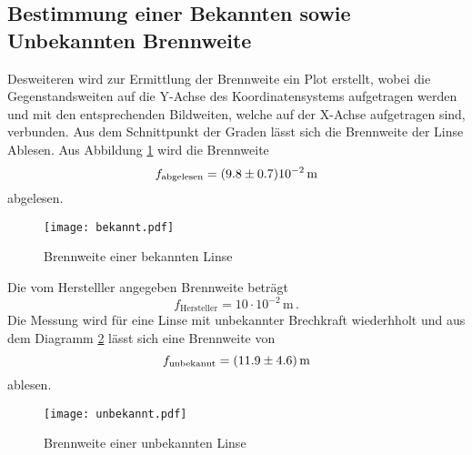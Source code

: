 \subsection{Bestimmung einer Bekannten sowie Unbekannten Brennweite}
Desweiteren wird zur Ermittlung der Brennweite ein Plot erstellt, wobei die Gegenstandsweiten auf die Y-Achse des Koordinatensystems aufgetragen werden und mit den entsprechenden Bildweiten, welche auf der X-Achse aufgetragen sind, verbunden. Aus dem Schnittpunkt der Graden lässt sich die Brennweite der Linse Ablesen. Aus Abbildung \ref{fig:fibek} wird die Brennweite
\begin{equation}
  f_\text{abgelesen} = (\num{9.8 +- 0.7}) 10^{-2} \, \text{m}
  \label{eqn:fbek}
\end{equation} abgelesen. 
\begin{figure}
  \centering
  \texttt{[image: bekannt.pdf]}
  \caption{Brennweite einer bekannten Linse}
  \label{fig:fibek}
\end{figure}
Die vom Herstelller angegeben Brennweite beträgt 
\begin{equation}
  f_\text{Hersteller} = 10\cdot10^{-2}  \, \text{m} \, .
  \label{eqn:fHer}
\end{equation}
Die Messung wird für eine Linse mit unbekannter Brechkraft wiederhholt und aus dem Diagramm \ref{fig:fiunb} lässt sich eine Brennweite von 
\begin{equation}
  f_\text{unbekannt} = (\num{11.9 +- 4.6}) \, \text{m}
  \label{eqn:unb}
\end{equation}
ablesen.
\begin{figure}
  \centering
  \texttt{[image: unbekannt.pdf]}
  \caption{Brennweite einer unbekannten Linse}
  \label{fig:fiunb}
\end{figure}

